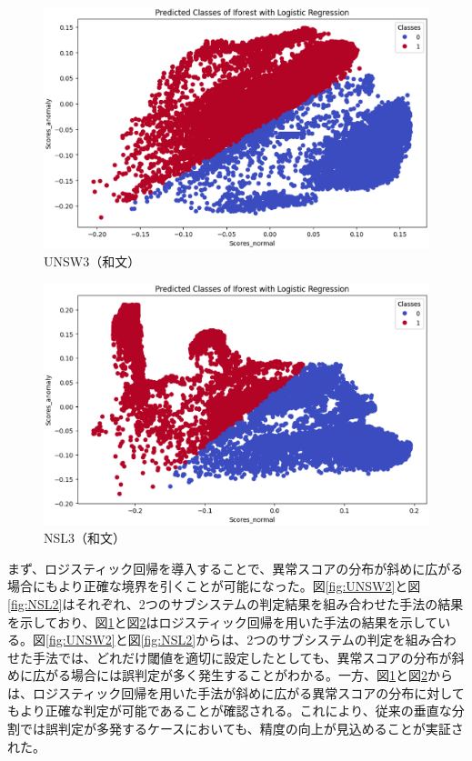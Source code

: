 \documentclass{css}
\begin{document}
\begin{figure}
    \centering
    \includegraphics[width=\linewidth]{pictures/eps/UNSW3.eps}
    \caption{UNSW3（和文）}
    \label{fig:UNSW3}
\end{figure}

\begin{figure}
    \centering
    \includegraphics[width=\linewidth]{pictures/eps/NSL3.eps}
    \caption{NSL3（和文）}
    \label{fig:NSL3}
\end{figure}

まず、ロジスティック回帰を導入することで、異常スコアの分布が斜めに広がる場合にもより正確な境界を引くことが可能になった。図\ref{fig:UNSW2}と図\ref{fig:NSL2}はそれぞれ、2つのサブシステムの判定結果を組み合わせた手法の結果を示しており、図\ref{fig:UNSW3}と図\ref{fig:NSL3}はロジスティック回帰を用いた手法の結果を示している。図\ref{fig:UNSW2}と図\ref{fig:NSL2}からは、2つのサブシステムの判定を組み合わせた手法では、どれだけ閾値を適切に設定したとしても、異常スコアの分布が斜めに広がる場合には誤判定が多く発生することがわかる。一方、図\ref{fig:UNSW3}と図\ref{fig:NSL3}からは、ロジスティック回帰を用いた手法が斜めに広がる異常スコアの分布に対してもより正確な判定が可能であることが確認される。これにより、従来の垂直な分割では誤判定が多発するケースにおいても、精度の向上が見込めることが実証された。
\end{document}
